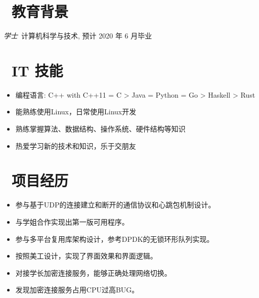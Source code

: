 \documentclass{resume}
\begin{document}


 
\section{\faGraduationCap\  教育背景}
\textit{学士}\ 计算机科学与技术, 预计 2020 年 6 月毕业

\section{\faCogs\ IT 技能}
\begin{itemize}[parsep=0.5ex]
  \item 编程语言: C++ with C++11 = C > Java = Python = Go > Haskell > Rust
  \item 能熟练使用Linux，日常使用Linux开发
  \item 熟练掌握算法、数据结构、操作系统、硬件结构等知识
  \item 热爱学习新的技术和知识，乐于交朋友
\end{itemize}

\section{\faUsers\ 项目经历}
\begin{itemize}
  \item 参与基于UDP的连接建立和断开的通信协议和心跳包机制设计。
  \item 与学姐合作实现出第一版可用程序。
  \item 参与多平台复用库架构设计，参考DPDK的无锁环形队列实现。
\end{itemize}

\begin{itemize}
  \item 按照美工设计，实现了界面效果和界面逻辑。
  \item 对接学长加密连接服务，能够正确处理网络切换。
  \item 发现加密连接服务占用CPU过高BUG。
\end{itemize}
\end{document}
